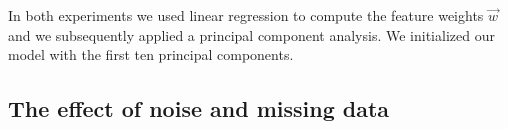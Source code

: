 In both experiments we used linear regression to compute the feature weights
$\vec w$ and we subsequently applied a principal component analysis. We
initialized our model with the first ten principal components.






%
%
%
%
%
%

\subsection{The effect of noise and missing data}

